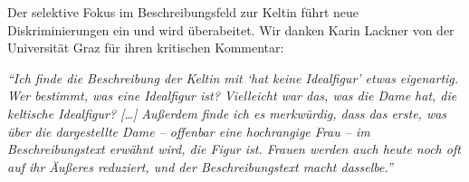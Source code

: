 \documentclass[
  letterpaper,
  DIV=11,
  numbers=noendperiod]{scrartcl}
\begin{document}
\begin{tcolorbox}[enhanced jigsaw, arc=.35mm, left=2mm, coltitle=black, leftrule=.75mm, bottomrule=.15mm, colframe=quarto-callout-important-color-frame, bottomtitle=1mm, colback=white, toprule=.15mm, toptitle=1mm, opacityback=0, colbacktitle=quarto-callout-important-color!10!white, breakable, rightrule=.15mm, titlerule=0mm, title=\textcolor{quarto-callout-important-color}{\faExclamation}\hspace{0.5em}{Hinweis zur anstehenden Überarbeitung des Handbuchs}, opacitybacktitle=0.6]

Der selektive Fokus im Beschreibungsfeld zur Keltin führt neue
Diskriminierungen ein und wird überabeitet. Wir danken Karin Lackner von
der Universität Graz für ihren kritischen Kommentar:

\emph{``Ich finde die Beschreibung der Keltin mit `hat keine Idealfigur'
etwas eigenartig. Wer bestimmt, was eine Idealfigur ist? Vielleicht war
das, was die Dame hat, die keltische Idealfigur? {[}\ldots{]} Außerdem
finde ich es merkwürdig, dass das erste, was über die dargestellte Dame
-- offenbar eine hochrangige Frau -- im Beschreibungstext erwähnt wird,
die Figur ist. Frauen werden auch heute noch oft auf ihr Äußeres
reduziert, und der Beschreibungstext macht dasselbe.''}

\end{tcolorbox}
\end{document}
